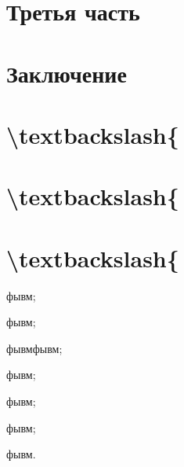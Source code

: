 \documentclass[paper=a4, fontsize=14pt, pagesize, DIV=calc, oneside]{scrreport}
\begin{document}

\chapter{Третья часть}




\chapter*{Заключение}




\chapter{\textbackslash{}textbackslash\{}




\chapter{\textbackslash{}textbackslash\{}




\chapter{\textbackslash{}textbackslash\{}



\begin{}

    \item фывм;

    \item фывм;

    \item фывмфывм;

    \item фывм;

    \item фывм;

    \item фывм;

    \item фывм.

\end{}
\end{document}
